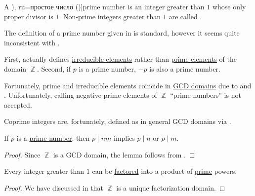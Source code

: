 \begin{definition}\label{def:prime_number}
  A \term[bg=просто число (\cite[10]{ДочевДимитровЧуканов1976}), ru=простое число (\cite[62]{Кострикин2004Том1})]{prime number} is an integer greater than \( 1 \) whose only proper \hyperref[def:divisibility]{divisor} is \( 1 \). Non-prime integers greater than \( 1 \) are called .
\end{definition}

\begin{remark}\label{rem:prime_numbers}
  The definition of a prime number given in  is standard, however it seems quite inconsistent with .

  First,  actually defines \hyperref[def:domain_divisibility/irreducible]{irreducible elements} rather than \hyperref[def:domain_divisibility/prime]{prime elements} of the domain \( \BbbZ \). Second, if \( p \) is a prime number, \( -p \) is also a prime number.

  Fortunately, prime and irreducible elements coincide in \hyperref[def:gcd_domain]{GCD domains} due to  and . Unfortunately, calling negative prime elements of \( \BbbZ \) \enquote{prime numbers} is not accepted.

  Coprime integers are, fortunately, defined as in general GCD domains via .
\end{remark}

\begin{lemma}\label{thm:euclids_lemma}
  If \( p \) is a \hyperref[def:prime_number]{prime number}, then \( p \mid nm \) implies \( p \mid n \) or \( p \mid m \).
\end{lemma}
\begin{proof}
  Since \( \BbbZ \) is a GCD domain, the lemma follows from .
\end{proof}

\begin{theorem}\label{thm:fundamental_theorem_of_arithmetic}
  Every integer greater than \( 1 \) can be \hyperref[def:irreducible_factorization]{factored} into a product of \hyperref[def:prime_number]{prime} powers.
\end{theorem}
\begin{proof}
  We have discussed in  that \( \BbbZ \) is a unique factorization domain.
\end{proof}

